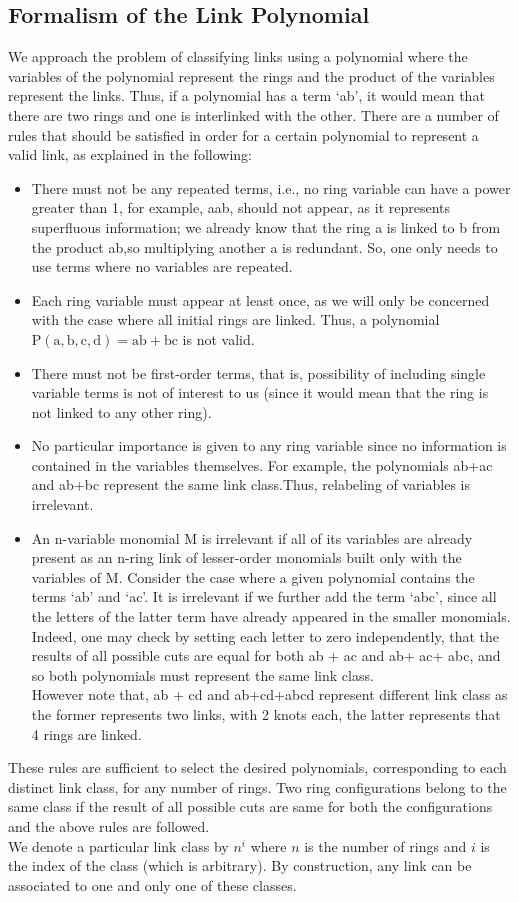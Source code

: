 \documentclass{scrartcl}
\begin{document}
\subsection{Formalism of the Link Polynomial}
We approach the problem of classifying links using a polynomial where the variables of the polynomial represent the rings and the product of the variables represent the links. Thus, if a polynomial has a term `ab', it would mean that there are two rings and one is interlinked with the other.
There are a number of rules that should be satisfied in order for a certain polynomial to represent a valid link, as explained in the following:
\begin{itemize}
    \item{There must not be any repeated terms, i.e., no ring variable can have a power greater than 1, for example, aab,
    should not appear, as it represents superfluous information; we already know that the ring a is linked to b from the product ab,so multiplying another a is redundant. So, one only needs to use terms where no variables are repeated.}
    \item{Each ring variable must appear at least once, as we will only be concerned with the case where all initial rings are linked. Thus, a polynomial $\mathrm{P(a,b,c,d) = ab+bc}$ is not valid.}
    \item{There must not be first-order terms, that is, possibility of including single variable terms is not of interest to us (since it would mean that the ring is not linked to any other ring). }
    \item{ No particular importance is given to any ring variable since no information is contained in the variables themselves. For example, the polynomials ab+ac and ab+bc represent the same link class.Thus, relabeling of variables is irrelevant.}
    \item{An n-variable monomial M is irrelevant if all of its variables are already present as an n-ring link of lesser-order  monomials built only with the variables of M. Consider the case where a given polynomial contains the terms `ab' and `ac'. It is irrelevant if we further add the term `abc', since all the letters of the latter term have already appeared in the smaller monomials. \\[0.3cm]Indeed, one may check by
    setting each letter to zero independently, that the results of all possible cuts are equal for both ab + ac and ab+ ac+ abc, and so both polynomials must represent the same link class.\\[0.3cm] However note that, ab + cd and ab+cd+abcd represent different link class as the former represents two links, with 2 knots each, the latter represents that 4 rings are linked.}
\end{itemize}
These rules are sufficient to select the desired polynomials, corresponding to each distinct link class, for any number of rings. Two ring configurations belong to the same class if the result of all possible cuts are same for both the configurations and the above rules are followed. \\[0.3cm]We denote a particular link class by $n^i$ where $n$ is the number of rings and $i$ is the index of the class (which is arbitrary). By construction, any link can be associated to one and only one of these classes. 
\end{document}
